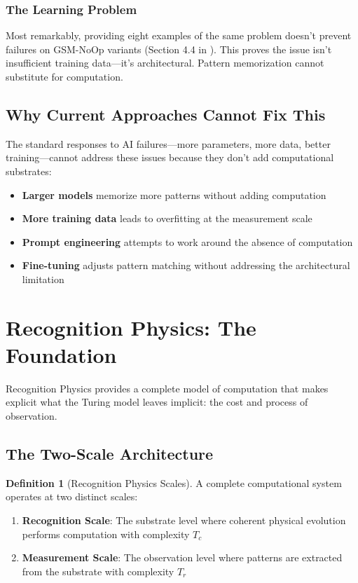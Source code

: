 \documentclass[11pt,letterpaper]{article}
\theoremstyle{plain}
\theoremstyle{definition}
\newtheorem{definition}[theorem]{Definition}
\theoremstyle{remark}
\begin{document}
\subsubsection{The Learning Problem}
Most remarkably, providing eight examples of the same problem doesn't prevent failures on GSM-NoOp variants (Section 4.4 in \cite{mirzadeh2024gsm}). This proves the issue isn't insufficient training data—it's architectural. Pattern memorization cannot substitute for computation.

\subsection{Why Current Approaches Cannot Fix This}

The standard responses to AI failures—more parameters, more data, better training—cannot address these issues because they don't add computational substrates:

\begin{itemize}
\item \textbf{Larger models} memorize more patterns without adding computation
\item \textbf{More training data} leads to overfitting at the measurement scale  
\item \textbf{Prompt engineering} attempts to work around the absence of computation
\item \textbf{Fine-tuning} adjusts pattern matching without addressing the architectural limitation
\end{itemize}

\section{Recognition Physics: The Foundation}
\label{sec:theory}

Recognition Physics provides a complete model of computation that makes explicit what the Turing model leaves implicit: the cost and process of observation.

\subsection{The Two-Scale Architecture}

\begin{definition}[Recognition Physics Scales]
A complete computational system operates at two distinct scales:
\begin{enumerate}
\item \textbf{Recognition Scale}: The substrate level where coherent physical evolution performs computation with complexity $T_c$
\item \textbf{Measurement Scale}: The observation level where patterns are extracted from the substrate with complexity $T_r$  
\end{enumerate}
\end{definition}
\end{document}

